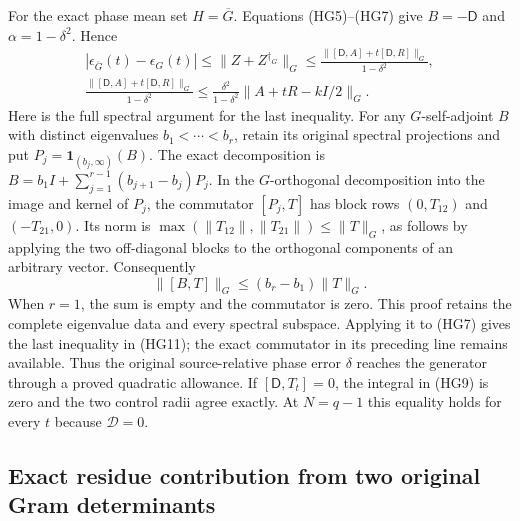 For the exact phase mean set $H=\overline G$. Equations (HG5)--(HG7)
give $B=-\mathsf D$ and $\alpha=1-\delta^2$. Hence
\[
\begin{gathered}
 |\epsilon_{\overline G}(t)-\epsilon_G(t)|
 \le\|Z+Z^{\dagger_G}\|_G
 \le\frac{\|[\mathsf D,A]+t[\mathsf D,R]\|_G}{1-\delta^2},\\
 \frac{\|[\mathsf D,A]+t[\mathsf D,R]\|_G}{1-\delta^2}
 \le\frac{\delta^2}{1-\delta^2}\|A+tR-kI/2\|_G .
\end{gathered}\tag{HG11}
\]
Here is the full spectral argument for the last inequality. For any
$G$-self-adjoint $B$ with distinct eigenvalues
$b_1<\cdots<b_r$, retain its original spectral projections and put
$P_j=\mathbf1_{(b_j,\infty)}(B)$. The exact decomposition is
$B=b_1I+\sum_{j=1}^{r-1}(b_{j+1}-b_j)P_j$.
In the $G$-orthogonal decomposition into the image and kernel of
$P_j$, the commutator $[P_j,T]$ has block rows $(0,T_{12})$
and $(-T_{21},0)$. Its norm is
$\max(\|T_{12}\|,\|T_{21}\|)\le\|T\|_G$, as follows by
applying the two off-diagonal blocks to the orthogonal components of
an arbitrary vector. Consequently
\[
 \|[B,T]\|_G\le (b_r-b_1)\|T\|_G .\tag{HG11a}
\]
When $r=1$, the sum is empty and the commutator is zero.
This proof retains the complete eigenvalue data and every spectral
subspace. Applying it to (HG7) gives the last inequality in (HG11);
the exact commutator in its preceding line remains available.
Thus the original
source-relative phase error $\delta$ reaches the generator through
a proved quadratic allowance. If $[\mathsf D,T_t]=0$, the integral
in (HG9) is zero and the two control radii agree exactly. At $N=q-1$
this equality holds for every $t$ because $\mathscr D=0$.

\subsection{Exact residue contribution from two original Gram determinants}


